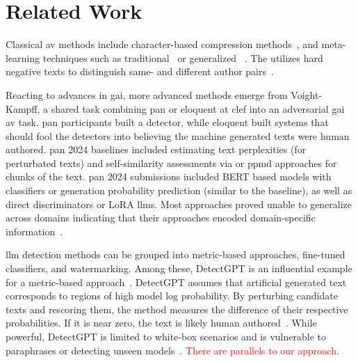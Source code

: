 \chapter{Related Work}
\label{chap:related_work}




Classical \ac{av} methods include character-based compression methods~\citep{tyo_state_2022,neal_surveying_2018}, and meta-learning techniques such as traditional~\citep{koppel_authorship_2004,koppel_authorship_2011} or generalized \unmasking{}~\citep{bevendorff_generalizing_2019,bevendorff_divergence_based_2020}.
The \impAppr{} utilizes hard negative texts to distinguish same- and different author pairs~\citep{koppel_determining_2014}.

Reacting to advances in \ac{gai}, more advanced methods emerge from Voight-Kampff, a shared task combining \acs{pan} or \ac{eloquent} at \ac{clef} into an adversarial \ac{gai} \ac{av} task.
\acs{pan} participants built a detector, while \ac{eloquent} built systems that should fool the detectors into believing the machine generated texts were human authored.
\acs{pan} 2024 baselines included estimating text perplexities (for perturbated texts) and self-similarity assessments via \unmasking{} or \ac{ppmd} approaches for chunks of the text.
\acs{pan} 2024 submissions included BERT based models with classifiers or generation probability prediction (similar to the baseline), as well as direct discriminators or LoRA \acp{llm}.
Most approaches proved unable to generalize across domains indicating that their approaches encoded domain-specific information~\citep{bevendorff_overview_2024}.

\Ac{llm} detection methods can be grouped into metric-based approaches, fine-tuned classifiers, and watermarking. 
Among these, DetectGPT is an influential example for a metric-based approach~\citep{wang_stumbling_2024}.
DetectGPT assumes that artificial generated text corresponds to regions of high model log probability. 
By perturbing candidate texts and rescoring them, the method measures the difference of their respective probabilities.
If it is near zero, the text is likely human authored~\citep{mitchell_detectgpt_2023}. 
While powerful, DetectGPT is limited to white-box scenarios %
and is vulnerable to paraphrases or detecting unseen models~\citep{Wu_ODD_challenges_2025}.
\textcolor{red}{There are parallels to our approach.}

